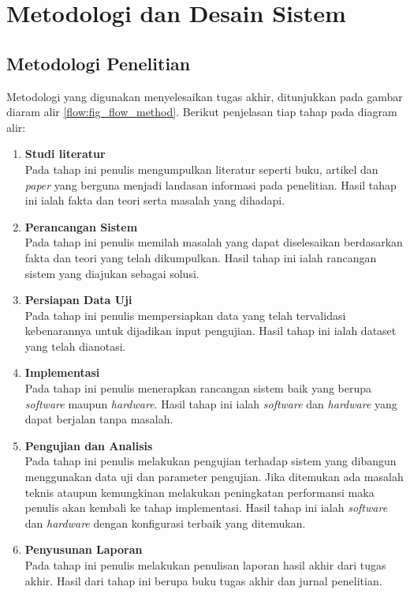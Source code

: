 \chapter{Metodologi dan Desain Sistem}
\section{Metodologi Penelitian}
Metodologi yang digunakan menyelesaikan tugas akhir, ditunjukkan pada gambar diaram alir \ref{flow:fig_flow_method}. Berikut penjelasan tiap tahap pada diagram alir:
\begin{enumerate}
	\item \textbf{Studi literatur} \\
	Pada tahap ini penulis mengumpulkan literatur seperti buku, artikel dan \textit{paper} yang berguna menjadi landasan informasi pada penelitian. Hasil tahap ini ialah fakta dan teori serta masalah yang dihadapi.
	\item \textbf{Perancangan Sistem} \\
	Pada tahap ini penulis memilah masalah yang dapat diselesaikan berdasarkan fakta dan teori yang telah dikumpulkan. Hasil tahap ini ialah rancangan sistem yang diajukan sebagai solusi.
	\item \textbf{Persiapan Data Uji} \\
	Pada tahap ini penulis mempersiapkan data yang telah tervalidasi kebenarannya untuk dijadikan input pengujian. Hasil tahap ini ialah dataset yang telah dianotasi.
	\item \textbf{Implementasi} \\
	Pada tahap ini penulis menerapkan rancangan sistem baik yang berupa \textit{software} maupun \textit{hardware}. Hasil tahap ini ialah \textit{software} dan \textit{hardware} yang dapat berjalan tanpa masalah.
	\item \textbf{Pengujian dan Analisis} \\
	Pada tahap ini penulis melakukan pengujian terhadap sistem yang dibangun menggunakan data uji dan parameter pengujian. Jika ditemukan ada masalah teknis ataupun kemungkinan melakukan peningkatan performansi maka penulis akan kembali ke tahap implementasi. Hasil tahap ini ialah \textit{software} dan \textit{hardware} dengan konfigurasi terbaik yang ditemukan.
	\item \textbf{Penyusunan Laporan} \\
	Pada tahap ini penulis melakukan penulisan laporan hasil akhir dari tugas akhir. Hasil dari tahap ini berupa buku tugas akhir dan jurnal penelitian.
\end{enumerate}

